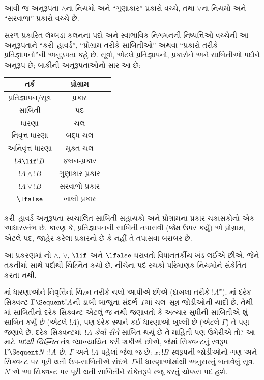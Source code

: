 આવી જ અનુરૂપતા $\land$ના નિયમો અને
``ગુણાકાર'' પ્રકારો વચ્ચે, તથા
$\lor$ના નિયમો અને ``સરવાળા''
પ્રકારો વચ્ચે છે.

સરળ પ્રકારિત લૅમ્બડા-કલનના પદો અને
સ્વાભાવિક નિગમનની નિષ્પત્તિઓ વચ્ચેની
આ અનુરૂપતાને ``કરી--હાવર્ડ'',
``પ્રોગ્રામ તરીકે સાબિતીઓ'' અથવા
``પ્રકારો તરીકે પ્રતિજ્ઞાપનો''ની
અનુરૂપતા કહે છે. સૂત્રો, એટલે
પ્રતિજ્ઞાપનો, પ્રકારોને અને સાબિતીઓ
પદોને અનુરૂપ છે; બાકીની અનુરૂપતાઓનો
સાર આ છે:
\begin{center}
  \begin{tabular}{c c c}
    તર્ક & પ્રોગ્રામ \\
    \hline
    પ્રતિજ્ઞાપન/સૂત્ર & પ્રકાર \\
    સાબિતી & પદ \\
    ધારણા & ચલ \\
    નિવૃત્ત ધારણા & બદ્ધ ચલ \\
    અનિવૃત્ત ધારણા & મુક્ત ચલ \\
    $!A \lif !B$ & ફલન-પ્રકાર \\
    $!A \land !B$ & ગુણાકાર-પ્રકાર \\
    $!A \lor !B$ & સરવાળો-પ્રકાર \\
    $\lfalse$ & ખાલી પ્રકાર \\
    \hline
  \end{tabular}
\end{center}

કરી--હાવર્ડ અનુરૂપતા સ્વચાલિત સાબિતી-સહાયકો
અને પ્રોગ્રામના પ્રકાર-ચકાસકોનો એક આધારસ્તંભ
છે. કારણ કે, પ્રતિજ્ઞાપનની સાબિતી તપાસવી
(જેમ ઉપર કર્યું) એ પ્રોગ્રામ, એટલે પદ,
જાહેર કરેલા પ્રકારનો છે કે નહીં તે તપાસવા
બરાબર છે.
\endgroup

\begingroup
\makeatletter{}\makeatother


\label{guunit:OLP-0688}


આ પ્રકરણમાં નો $\land$, $\lor$, $\lif$ અને
$\lfalse$ ધરાવતો વિધાનતર્કીય ખંડ લઈએ છીએ, જેને
તકતીમાં  સાથે પદોથી ચિહ્નિત કર્યો છે.
નીચેના પદ-રચકો પરિમાણક-નિયમોને સંકેતિત કરતા નથી.

માં ધારણાઓને નિવૃત્તિનાં ચિહ્ન તરીકે
ચલો આપીએ છીએ (દાખલા તરીકે $!A^x$).
માં દરેક સિક્વન્ટ $\Gamma \Sequent !A$ની
ડાબી બાજુના સંદર્ભ~$\Gamma$માં ચલ--સૂત્ર
જોડીઓની યાદી છે. તેથી માં
સાબિતીનો દરેક સિક્વન્ટ એટલું જ નથી
જણાવતો કે અત્યાર સુધીની સાબિતીએ શું
સાબિત કર્યું છે (એટલે $!A$), પણ દરેક
સ્થાને કઈ ધારણાઓ ખુલ્લી છે (એટલે $\Gamma$)
તે પણ જણાવે છે. દરેક સિક્વન્ટમાં~$!A$
\emph{કેવી રીતે} સાબિત થયું છે તે
માહિતી પણ ઉમેરીએ તો? આ માટે
\emph{પદથી ચિહ્નિત} તંત્ર 
વ્યાખ્યાયિત કરી શકીએ છીએ, જેમાં સિક્વન્ટનું
સ્વરૂપ $\Gamma \Sequent N : !A$ છે.
$\Gamma$ અને $!A$ પહેલાં જેવા જ છે:
$x: !B$ સ્વરૂપની જોડીઓનો ગણ અને
સિક્વન્ટ પર પૂરી થતી ઉપ-સાબિતીએ
સંદર્ભ~$\Gamma$ની ધારણાઓમાંથી અનુસરતું
બતાવેલું સૂત્ર. $N$ એ આ સિક્વન્ટ
પર પૂરી થતી સાબિતીને સંકેતરૂપે
રજૂ કરતું ચોક્કસ પદ હશે.

